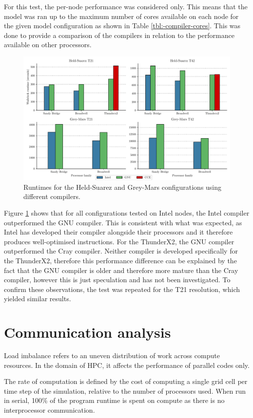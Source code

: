 \documentclass[a4paper,11pt]{report}
\begin{document}
\par

For this test, the per-node performance was considered only. This means that the model  was ran up to the maximum number of cores available on each node for the given model configuration as shown in Table \ref{tbl:-compiler-cores}. This was done to provide a comparison of the compilers in relation to the performance available on other processors.  
\begin{figure}[htbp]
\begin{center}
\includegraphics[width=1\textwidth]{img/compiler-comparison.pdf}
\caption{Runtimes for the Held-Suarez and Grey-Mars configurations using different compilers.}
\label{fig:compiler-comparison-t42}
\end{center}
\end{figure}
\par
Figure \ref{fig:compiler-comparison-t42} shows that for all configurations tested on Intel nodes, the Intel compiler outperformed the GNU compiler. This is consistent with what was expected, as Intel has developed their compiler alongside their processors and it therefore produces well-optimised instructions. For the ThunderX2, the GNU compiler outperformed the Cray compiler. Neither compiler is developed specifically for the ThunderX2, therefore this performance difference can be explained by the fact that the GNU compiler is older and therefore more mature than the Cray compiler, however this is just speculation and has not been investigated. To confirm these observations, the test was repeated for the T21 resolution, which yielded similar results. 



\section{Communication analysis}
Load imbalance refers to an uneven distribution of work across compute resources. In the domain of HPC, it affects the performance of parallel codes only.
\par
The rate of computation is defined by the cost of computing a single grid cell per time step of the simulation, relative to the number of processors used. When run in serial, 100\% of the program runtime is spent on compute as there is no interprocessor communication. 
\end{document}

